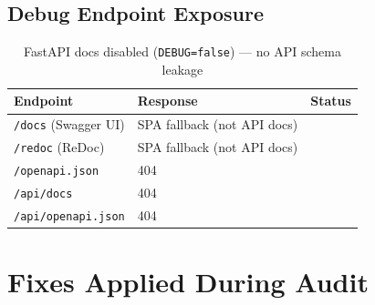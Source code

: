 \documentclass[12pt,a4paper]{article}
\newcommand{\pass}{\textcolor{success}{\checkmark}}
\begin{document}
\subsection{Debug Endpoint Exposure}

\begin{table}[H]
\centering
\begin{tabular}{lll}
\toprule
\textbf{Endpoint} & \textbf{Response} & \textbf{Status} \\
\midrule
\texttt{/docs} (Swagger UI) & SPA fallback (not API docs) & \pass \\
\texttt{/redoc} (ReDoc) & SPA fallback (not API docs) & \pass \\
\texttt{/openapi.json} & 404 & \pass \\
\texttt{/api/docs} & 404 & \pass \\
\texttt{/api/openapi.json} & 404 & \pass \\
\bottomrule
\end{tabular}
\caption{FastAPI docs disabled (\texttt{DEBUG=false}) --- no API schema leakage}
\end{table}

\section{Fixes Applied During Audit}
\end{document}

